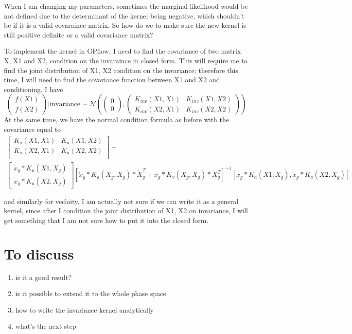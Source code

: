 \documentclass{article}
\begin{document}
When I am changing my parameters, sometimes the marginal likelihood would be not defined due to the determinant of the kernel being negative, which shouldn't be if it is a valid covaraince matrix. 
So how do we to make sure the new kernel is still positive definite or a valid covariance matrix?


To implement the kernel in GPflow, I need to find the covariance of two matrix X, X1 and X2, condition on the invaraince in closed form.
This will require me to find the joint distribution of X1, X2 condition on the invariance; therefore this time, I will need to find the covariance function between X1 and X2 and conditioning.
I have 
$$
\begin{pmatrix}
  f(X1)  \\ f(X2)
\end{pmatrix}|\text{invariance}
\sim \mathcal{N}
\left(
\begin{pmatrix}
  0\\0
\end{pmatrix}  
,
\begin{pmatrix}
K_{inv}(X1, X1) & K_{inv}(X1, X2) \\ K_{inv}(X2, X1) & K_{inv}(X2, X2)  
\end{pmatrix}
\right)
$$
At the same time, we have the normal condition formula as before
with the covariance equal to 
$$
\begin{multlined}
\begin{bmatrix}
  K_a(X1, X1) & K_a(X1, X2) \\ K_a(X2, X1) & K_a(X2, X2)\\
\end{bmatrix}
-\\
\begin{bmatrix}
  \dot{x}_g*K_a(X1, X_g) \\ \dot{x}_g*K_a(X2, X_g)
\end{bmatrix}
\left[\dot{x}_g*K_a(X_g, X_g)*\dot{X}_g^T+x_g*K_v(X_g, X_g)*X_g^T\right]^{-1}\left[\dot{x}_g*K_a(X1, X_g), \dot{x}_g*K_a(X2, X_g)\right]
\end{multlined}
$$

and similarly for vecloity, I am actually not sure if we can write it as a general kernel, since after I condition the joint distribution of X1, X2 on invariance, I will get something that I am not sure how to put it into the closed form.

\section*{To discuss}
\begin{enumerate}
  \item is it a good result?
  \item is it possible to extend it to the whole phase space
  \item how to write the invariance kernel analytically
  \item what's the next step
\end{enumerate}
\end{document}
